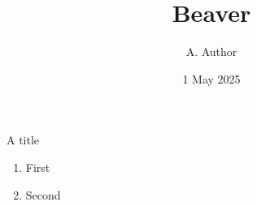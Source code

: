 \documentclass{beamer}
\title{Beaver}
\author{A. Author}
\date{1 May 2025}
\begin{document}
\begin{frame}
\titlepage
\end{frame}
\begin{frame}{A title}
\begin{enumerate}
\item First
\item Second
\end{enumerate}
\end{frame}
\end{document}
